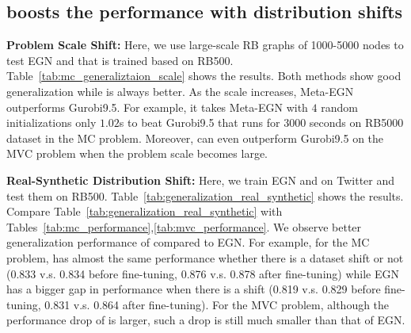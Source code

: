 \subsection{\proj boosts the performance with distribution shifts}\label{sec:out-dis}
\textbf{Problem Scale Shift:} Here, we use large-scale RB graphs of 1000-5000 nodes to test EGN and \proj that is trained based on RB500. Table~\ref{tab:mc_generaliztaion_scale} shows the results. Both methods show good generalization while \proj is always better. As the scale increases, Meta-EGN outperforms Gurobi9.5. For example, it takes Meta-EGN with $4$ random initializations only $1.02$s to beat Gurobi9.5 that runs for $3000$ seconds on RB5000 dataset in the MC problem. Moreover, \proj can even outperform Gurobi9.5 on the MVC problem when the problem scale becomes large.



\textbf{Real-Synthetic Distribution Shift:} Here, we train EGN and \proj on Twitter and test them on RB500.  Table~\ref{tab:generalization_real_synthetic} shows the results. Compare Table~\ref{tab:generalization_real_synthetic} with Tables~\ref{tab:mc_performance},\ref{tab:mvc_performance}. We observe better generalization performance of \proj compared to EGN. For example, for the MC problem, \proj has almost the same performance 
whether there is a dataset shift or not (0.833 v.s. 0.834 before fine-tuning, 0.876 v.s. 0.878  after fine-tuning) while EGN has a bigger gap in performance when there is a shift (0.819 v.s. 0.829 before fine-tuning, 0.831 v.s. 0.864 after fine-tuning). For the MVC problem, although the performance drop of \proj is larger, such a drop is still much smaller than that of EGN.   

